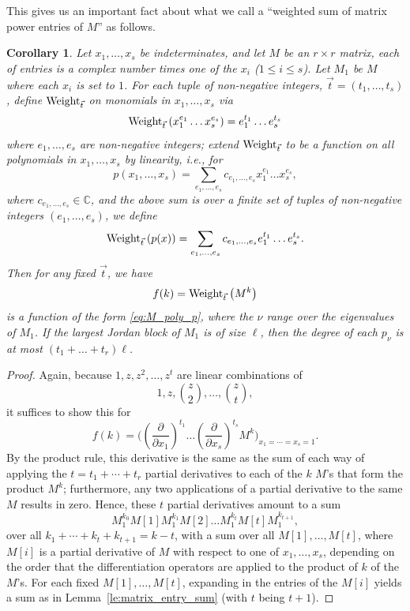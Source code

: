 \documentclass{memo-l}
\theoremstyle{plain}
\newtheorem{corollary}[theorem]{Corollary}
\theoremstyle{definition}
\numberwithin{section}{chapter}
\numberwithin{equation}{chapter}
\newcommand{\complex}{{\mathbb C}}
\theoremstyle{plain}
\theoremstyle{definition}
\begin{document}
This gives us an important fact about what we
call a ``weighted sum of matrix power entries of $M$'' as follows.
\begin{corollary}\label{co:weighted_sum}
Let $x_1,\ldots,x_s$ be indeterminates, and let $M$ be an $r\times r$
matrix, each
of entries is a complex number times one of the $x_i$ ($1\le i\le s$).
Let $M_1$ be $M$ where each $x_i$ is set to $1$.
For each tuple of non-negative integers, $\vec t=(t_1,\ldots,t_s)$, define
${\rm Weight}_{\vec t}$ on monomials in $x_1,\ldots,x_s$ via
$$
{\rm Weight}_{\vec t\;}( x_1^{e_1}\ldots x_s^{e_s} )
=
e_1^{t_1}\ldots e_s^{t_s} 
$$
where $e_1,\ldots,e_s$ are non-negative integers;
extend ${\rm Weight}_{\vec t}$ to be a function on all polynomials
in $x_1,\ldots,x_s$ by linearity, i.e., for
$$
p(x_1,\ldots,x_s) = \sum_{e_1,\ldots,e_s} c_{e_1,\ldots,e_s}
x_1^{e_1}\ldots x_s^{e_s} ,
$$
where $c_{e_1,\ldots,e_s}\in\complex$, and the above sum is over a 
finite set of tuples of non-negative integers $(e_1,\ldots,e_s)$, we define
$$
{\rm Weight}_{\vec t\;}(p(x))  =
\sum_{e_1,\ldots,e_s} c_{e_1,\ldots,e_s}
e_1^{t_1}\ldots e_s^{t_s}.
$$
Then for any fixed $\vec t$, we have
$$
f(k) = {\rm Weight}_{\vec t\;}\bigl( M^k \bigr) 
$$
is a function of the form 
\eqref{eq:M_poly_p},
where the $\nu$ range over the eigenvalues of $M_1$.
If the largest Jordan block of $M_1$ is of size $\ell$, then the
degree of each $p_\nu$ is at most 
$(t_1+\ldots+t_r)\ell$.
\end{corollary}
\begin{proof}
Again, because $1,z,z^2,\ldots,z^t$ are linear combinations of
$$
1,z,\binom{z}{2},\ldots,\binom{z}{t},
$$ 
it
suffices to show this for 
$$
f(k)=
\Biggl(
\left(\frac{\partial}{\partial x_1}\right)^{t_1} 
\ldots
\left(\frac{\partial}{\partial x_s}\right)^{t_s} 
M^k
\Biggr)_{x_1=\cdots=x_s=1}.
$$
By the product rule, this derivative is the same as the 
sum of each way of applying the
$t=t_1+\cdots+t_r$ partial derivatives to each of the $k$ $M$'s that 
form the product $M^k$; furthermore, any two applications of a partial
derivative to the same $M$ results in zero.  Hence, these $t$
partial derivatives amount to a sum
$$
M_1^{k_0} M[1] 
M_1^{k_1} M[2]
\ldots
M_1^{k_t} M[t]
M_1^{k_{t+1}},
$$
over all $k_1+\cdots+k_t + k_{t+1}= k-t$, 
with a sum over all $M[1],\ldots,M[t]$,
where $M[i]$ is a partial derivative
of $M$ with respect to one of $x_1,\ldots,x_s$, depending on the order
that the differentiation operators are applied to the product of
$k$ of the $M$'s.
For each fixed $M[1],\ldots,M[t]$, expanding in the entries of the 
$M[i]$ yields a sum as in
Lemma~\ref{le:matrix_entry_sum} (with $t$ being $t+1$).
\end{proof}
\end{document}
